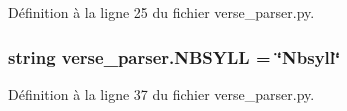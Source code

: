 Définition à la ligne 25 du fichier verse\+\_\+parser.\+py.

\hypertarget{namespaceverse__parser_adacd70f9f57e19f6f317ef8ce8146edc}{}
\subsubsection[{N\+B\+S\+Y\+L\+L}]{\setlength{\rightskip}{0pt plus 5cm}string verse\+\_\+parser.\+N\+B\+S\+Y\+L\+L = \char`\"{}Nbsyll\char`\"{}}\label{namespaceverse__parser_adacd70f9f57e19f6f317ef8ce8146edc}


Définition à la ligne 37 du fichier verse\+\_\+parser.\+py.

